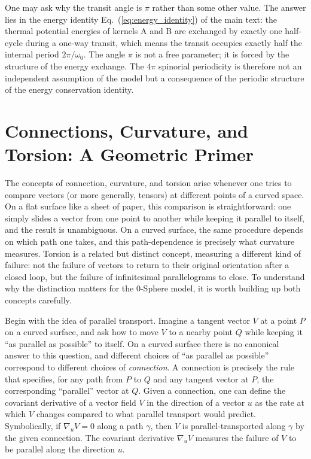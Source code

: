 \documentclass[%
 reprint,
 amsmath,amssymb,
 aps,
 prb,
]{revtex4-2}
\numberwithin{equation}{section}
\begin{document}
One may ask why the transit angle is $\pi$ rather than some other value. The answer lies in the energy identity Eq.~(\ref{eq:energy_identity}) of the main text: the thermal potential energies of kernels A and B are exchanged by exactly one half-cycle during a one-way transit, which means the transit occupies exactly half the internal period $2\pi/\omega_0$. The angle $\pi$ is not a free parameter; it is forced by the structure of the energy exchange. The $4\pi$ spinorial periodicity is therefore not an independent assumption of the model but a consequence of the periodic structure of the energy conservation identity.

\section{Connections, Curvature, and Torsion: A Geometric Primer}
\label{app:geometry}

The concepts of connection, curvature, and torsion arise whenever one tries to compare vectors (or more generally, tensors) at different points of a curved space. On a flat surface like a sheet of paper, this comparison is straightforward: one simply slides a vector from one point to another while keeping it parallel to itself, and the result is unambiguous. On a curved surface, the same procedure depends on which path one takes, and this path-dependence is precisely what curvature measures. Torsion is a related but distinct concept, measuring a different kind of failure: not the failure of vectors to return to their original orientation after a closed loop, but the failure of infinitesimal parallelograms to close. To understand why the distinction matters for the 0-Sphere model, it is worth building up both concepts carefully.

Begin with the idea of parallel transport. Imagine a tangent vector $V$ at a point $P$ on a curved surface, and ask how to move $V$ to a nearby point $Q$ while keeping it ``as parallel as possible'' to itself. On a curved surface there is no canonical answer to this question, and different choices of ``as parallel as possible'' correspond to different choices of \emph{connection}. A connection is precisely the rule that specifies, for any path from $P$ to $Q$ and any tangent vector at $P$, the corresponding ``parallel'' vector at $Q$. Given a connection, one can define the covariant derivative of a vector field $V$ in the direction of a vector $u$ as the rate at which $V$ changes compared to what parallel transport would predict. Symbolically, if $\nabla_u V = 0$ along a path $\gamma$, then $V$ is parallel-transported along $\gamma$ by the given connection. The covariant derivative $\nabla_u V$ measures the failure of $V$ to be parallel along the direction $u$.
\end{document}
